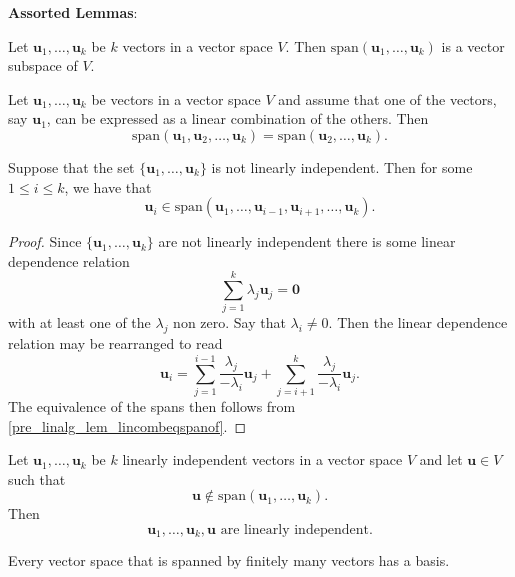 \documentclass[10pt, a4paper]{article}
\newcommand{\mbf}[1]{\mathbf{#1}}
\begin{document}
\textbf{Assorted Lemmas}:
\begin{lemma}
    Let $\mbf{u}_1, \dotsc, \mbf{u}_k$ be $k$ vectors in a vector space $V$.
    Then $\mathrm{span}(\mbf{u}_1, \dotsc, \mbf{u}_k)$ is a vector subspace of $V$.
\end{lemma}
\begin{lemma}\label{pre_linalg_lem_lincombeqspanof}
    Let $\mbf{u}_1, \dotsc, \mbf{u}_k$ be vectors in a vector space $V$ and assume that one of the vectors,
    say $\mbf{u}_1$,
    can be expressed as a linear combination of the others.
    Then
    \[
    \mathrm{span}(\mbf{u}_1, \mbf{u}_2, \dotsc, \mbf{u}_k) = \mathrm{span}(\mbf{u}_2, \dotsc, \mbf{u}_k).
    \]
\end{lemma}
\begin{lemma}
    Suppose that the set $\{\mbf{u}_1, \dotsc, \mbf{u}_k\}$ is not linearly independent.
    Then for some $1 \leq i \leq k$,
    we have that
    \[
    \mbf{u}_i \in \mathrm{span}(\mbf{u}_1, \dotsc, \mbf{u}_{i - 1}, \mbf{u}_{i + 1}, \dotsc, \mbf{u}_k).
    \]
    \begin{proof}
        Since $\{\mbf{u}_1, \dotsc, \mbf{u}_k\}$ are not linearly independent there is some linear dependence relation
        \[
        \sum_{j = 1}^{k}\lambda_j\mbf{u}_j = \mbf{0}
        \]
        with at least one of the $\lambda_j$ non zero.
        Say that $\lambda_i \neq 0$.
        Then the linear dependence relation may be rearranged to read
        \[
        \mbf{u}_i = \sum_{j = 1}^{i - 1}\frac{\lambda_j}{-\lambda_i}\mbf{u}_j + \sum_{j = i + 1}^{k}\frac{\lambda_j}{-\lambda_i}\mbf{u}_j.
        \]
        The equivalence of the spans then follows from \autoref{pre_linalg_lem_lincombeqspanof}.
    \end{proof}
\end{lemma}

\begin{lemma}\label{pre_linalg_lem_ifnotinspanofvecspacethenlinindep}
    Let $\mbf{u}_1, \dotsc, \mbf{u}_k$ be $k$ linearly independent vectors in a vector space $V$ and let $\mbf{u} \in V$ such that
    \[
    \mbf{u} \notin \mathrm{span}(\mbf{u}_1, \dotsc, \mbf{u}_k).
    \]
    Then
    \[
    \mbf{u}_1, \dotsc, \mbf{u}_k, \mbf{u}\text{ are linearly independent}.
    \]
\end{lemma}

\begin{theorem}
    Every vector space that is spanned by finitely many vectors has a basis.
\end{theorem}
\end{document}
